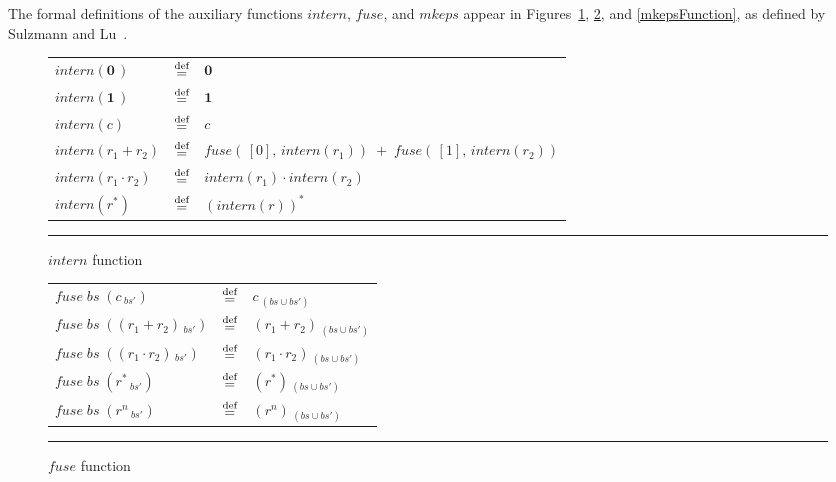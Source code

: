 \documentclass[12pt]{article}
\newcommand{\dn}{\ensuremath{\stackrel{\mbox{\scriptsize def}}{=}}}
\newcommand{\ZERO}{\textbf{0}}
\newcommand{\ONE}{\textbf{1}}
\newcommand{\fuse}{\textit{fuse}}
\newcommand{\mkeps}{\textit{mkeps}}
\newcommand{\intern}{\textit{intern}}
\begin{document}
The formal definitions of the auxiliary functions $\intern$, $\fuse$, and $\mkeps$ 
appear in Figures~\ref{internFunction}, \ref{fuseFunction}, and \ref{mkepsFunction}, 
as defined by Sulzmann and Lu~\cite{Sulzmann2014}.
\begin{figure}[ht]
  \begin{center}
  \renewcommand{\arraystretch}{1.5}
  \begin{tabular}{lcl}
    $ \intern(\ZERO\,) $       & \dn & $ \ZERO\, $ \\
    $ \intern(\ONE\,) $        & \dn & $ \ONE\, $ \\
    $ \intern(c) $             & \dn & $ c $ \\
    $ \intern(r_1 + r_2) $     & \dn & $ \fuse(\,[0],\, \intern(r_1)) \;+\; \fuse(\,[1],\, \intern(r_2)) $ \\
    $ \intern(r_1 \cdot r_2) $ & \dn & $ \intern(r_1) \cdot \intern(r_2) $ \\
    $ \intern(r^*) $           & \dn & $ (\intern(r))^* $ \\
  \end{tabular}%
  \renewcommand{\arraystretch}{1.0}
  
    \mbox{}
    \rule{\linewidth}{0.4pt}
    \caption{$\intern$ function}\label{internFunction}
  \end{center}
\end{figure}
\begin{figure}[ht]
  \begin{center}
    \renewcommand{\arraystretch}{1.5}
    \begin{tabular}{lcl}
      $ \fuse\; bs\; (c\,_{bs'}) $                & \dn & $ c\,_{(bs \cup bs')} $ \\
      $ \fuse\; bs\; ((r_1 + r_2)\,_{bs'}) $      & \dn & $ (r_1 + r_2)\,_{(bs \cup bs')} $ \\
      $ \fuse\; bs\; ((r_1 \cdot r_2)\,_{bs'}) $  & \dn & $ (r_1 \cdot r_2)\,_{(bs \cup bs')} $ \\
      $ \fuse\; bs\; (r^*\,_{bs'}) $              & \dn & $ (r^*)\,_{(bs \cup bs')} $ \\
      $ \fuse\; bs\; (r^n\,_{bs'}) $              & \dn & $ (r^n)\,_{(bs \cup bs')} $ \\
    \end{tabular}
    \renewcommand{\arraystretch}{1.0}

    \mbox{}
    \rule{\linewidth}{0.4pt}
    \caption{$\fuse$ function}\label{fuseFunction}
  \end{center}
\end{figure}
\end{document}
